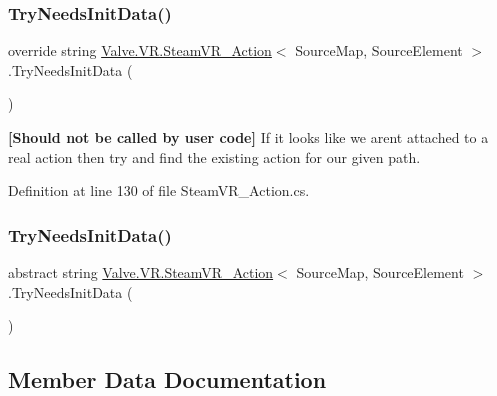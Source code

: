 \subsubsection{\texorpdfstring{TryNeedsInitData()}{TryNeedsInitData()}\hspace{0.1cm}{\footnotesize\ttfamily [1/2]}}
{\footnotesize\ttfamily override string \mbox{\hyperlink{class_valve_1_1_v_r_1_1_steam_v_r___action}{Valve.\+V\+R.\+Steam\+V\+R\+\_\+\+Action}}$<$ Source\+Map, Source\+Element $>$.Try\+Needs\+Init\+Data (\begin{DoxyParamCaption}{ }\end{DoxyParamCaption})}



{\bfseries{\mbox{[}Should not be called by user code\mbox{]}}} If it looks like we aren\textquotesingle{}t attached to a real action then try and find the existing action for our given path. 



Definition at line 130 of file Steam\+V\+R\+\_\+\+Action.\+cs.

\mbox{\label{class_valve_1_1_v_r_1_1_steam_v_r___action_af53dc99944ee543c7570e6defc55aa48}} 
\subsubsection{\texorpdfstring{TryNeedsInitData()}{TryNeedsInitData()}\hspace{0.1cm}{\footnotesize\ttfamily [2/2]}}
{\footnotesize\ttfamily abstract string \mbox{\hyperlink{class_valve_1_1_v_r_1_1_steam_v_r___action}{Valve.\+V\+R.\+Steam\+V\+R\+\_\+\+Action}}$<$ Source\+Map, Source\+Element $>$.Try\+Needs\+Init\+Data (\begin{DoxyParamCaption}{ }\end{DoxyParamCaption})\hspace{0.3cm}{\ttfamily [pure virtual]}}



\subsection{Member Data Documentation}
\mbox{\label{class_valve_1_1_v_r_1_1_steam_v_r___action_a75a8c6b9641982a47e32039b131e3eca}} 
